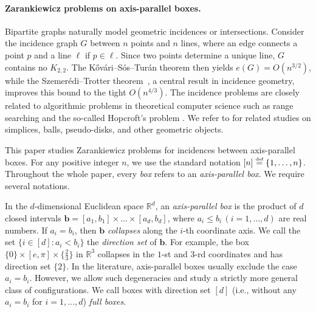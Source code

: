 \documentclass[11pt]{article}
\theoremstyle{definition}
\newcommand*{\eqdef}{\stackrel{\mbox{\normalfont\tiny def}}{=}} %
\newcommand*{\R}{\mathbb{R}}                                    %
\begin{document}
\paragraph{Zarankiewicz problems on axis-parallel boxes.} Bipartite graphs naturally model geometric incidences or intersections. Consider the incidence graph $G$ between $n$ points and $n$ lines, where an edge connects a point $p$ and a line $\ell$ if $p \in \ell$. Since two points determine a unique line, $G$ contains no $K_{2,2}$. The K\H{o}v\'{a}ri--S\'{o}s--Tur\'{a}n theorem then yields $e(G) = O(n^{3/2})$, while the Szemer\'{e}di--Trotter theorem~\cite{szemeredi_trotter}, a central result in incidence geometry, improves this bound to the tight $O(n^{4/3})$. The incidence problems are closely related to algorithmic problems in theoretical computer science such as range searching \cite{agarwal_erickson} and the so-called Hopcroft's problem \cite{chan_zheng}. We refer to \cite{mustafa_pach,chan_har-peled,chan_keller_smorodinsky} for related studies on simplices, balls, pseudo-disks, and other geometric objects. 

This paper studies Zarankiewicz problems for incidences between axis-parallel boxes. For any positive integer $n$, we use the standard notation $[n] \eqdef \{1, \dots, n\}$. Throughout the whole paper, every \emph{box} refers to an \emph{axis-parallel box}. We require several notations. 

In the $d$-dimensional Euclidean space $\R^d$, an \emph{axis-parallel box} is the product of $d$ closed intervals $\bm{b} = [a_1, b_1] \times \dots \times [a_d, b_d]$, where $a_i \le b_i \, (i = 1, \dots, d)$ are real numbers. If $a_i = b_i$, then $\bm{b}$ \emph{collapses} along the $i$-th coordinate axis. We call the set $\bigl\{ i \in [d] : a_i < b_i \bigr\}$ the \emph{direction set} of $\bm{b}$. For example, the box $\{0\} \times [e, \pi] \times \{\frac{2}{3}\}$ in $\R^3$ collapses in the $1$-st and $3$-rd coordinates and has direction set $\{2\}$. In the literature, axis-parallel boxes usually exclude the case $a_i = b_i$. However, we allow such degeneracies and study a strictly more general class of configurations. We call boxes with direction set $[d]$ (i.e., without any $a_i = b_i$ for $i = 1, \dots, d$) \emph{full boxes}. 
\end{document}

